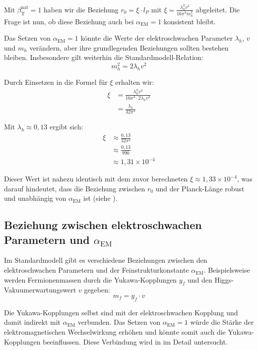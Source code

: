 \documentclass[12pt,a4paper]{article}
\newcommand{\alphaEM}{\alpha_{\text{EM}}}
\newcommand{\betaT}{\beta_{\text{T}}}
\begin{document}
	Mit \(\betaT^{\text{nat}} = 1\) haben wir die Beziehung \(r_0 = \xi \cdot l_P\) mit \(\xi = \frac{\lambda_h^2 v^2}{16\pi^3 m_h^2}\) abgeleitet. Die Frage ist nun, ob diese Beziehung auch bei \(\alphaEM = 1\) konsistent bleibt.
	
	Das Setzen von \(\alphaEM = 1\) könnte die Werte der elektroschwachen Parameter \(\lambda_h\), \(v\) und \(m_h\) verändern, aber ihre grundlegenden Beziehungen sollten bestehen bleiben. Insbesondere gilt weiterhin die Standardmodell-Relation:
	\begin{equation}
		m_h^2 = 2\lambda_h v^2
	\end{equation}
	
	Durch Einsetzen in die Formel für \(\xi\) erhalten wir:
	\begin{align}
		\xi &= \frac{\lambda_h^2 v^2}{16\pi^3 \cdot 2\lambda_h v^2} \\
		&= \frac{\lambda_h}{32\pi^3}
	\end{align}
	
	Mit \(\lambda_h \approx 0,13\) ergibt sich:
	\begin{align}
		\xi &\approx \frac{0,13}{32\pi^3} \\
		&\approx \frac{0,13}{990} \\
		&\approx 1,31 \times 10^{-4}
	\end{align}
	
	Dieser Wert ist nahezu identisch mit dem zuvor berechneten \(\xi \approx 1,33 \times 10^{-4}\), was darauf hindeutet, dass die Beziehung zwischen \(r_0\) und der Planck-Länge robust und unabhängig von \(\alphaEM\) ist (siehe \cite{pascher_planck_2025}).
	
	\subsection{Beziehung zwischen elektroschwachen Parametern und \(\alphaEM\)}
	\label{subsec:electroweak_alpha}
	
	Im Standardmodell gibt es verschiedene Beziehungen zwischen den elektroschwachen Parametern und der Feinstrukturkonstante \(\alphaEM\). Beispielsweise werden Fermionenmassen durch die Yukawa-Kopplungen \(y_f\) und den Higgs-Vakuumerwartungswert \(v\) gegeben:
	\begin{equation}
		m_f = y_f \cdot v
	\end{equation}
	
	Die Yukawa-Kopplungen selbst sind mit der elektroschwachen Kopplung und damit indirekt mit \(\alphaEM\) verbunden. Das Setzen von \(\alphaEM = 1\) würde die Stärke der elektromagnetischen Wechselwirkung erhöhen und könnte somit auch die Yukawa-Kopplungen beeinflussen. Diese Verbindung wird in \cite{pascher_higgs_2025} im Detail untersucht.
	
\end{document}
